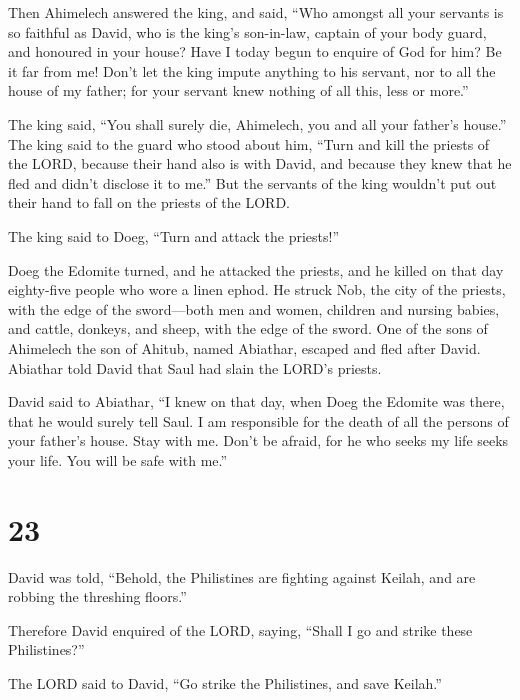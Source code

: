  Then Ahimelech answered the king, and said, ``Who
amongst all your servants is so faithful as David, who is the king's
son-in-law, captain of your body guard, and honoured in your house?
 Have I today begun to enquire of God for him? Be it far
from me! Don't let the king impute anything to his servant, nor to all
the house of my father; for your servant knew nothing of all this, less
or more.''

 The king said, ``You shall surely die, Ahimelech, you
and all your father's house.''  The king said to the
guard who stood about him, ``Turn and kill the priests of the LORD,
because their hand also is with David, and because they knew that he
fled and didn't disclose it to me.'' But the servants of the king
wouldn't put out their hand to fall on the priests of the LORD.

 The king said to Doeg, ``Turn and attack the priests!''

Doeg the Edomite turned, and he attacked the priests, and he killed on
that day eighty-five people who wore a linen ephod.  He
struck Nob, the city of the priests, with the edge of the sword---both
men and women, children and nursing babies, and cattle, donkeys, and
sheep, with the edge of the sword.  One of the sons of
Ahimelech the son of Ahitub, named Abiathar, escaped and fled after
David.  Abiathar told David that Saul had slain the
LORD's priests.

 David said to Abiathar, ``I knew on that day, when Doeg
the Edomite was there, that he would surely tell Saul. I am responsible
for the death of all the persons of your father's house. 
Stay with me. Don't be afraid, for he who seeks my life seeks your life.
You will be safe with me.''

\hypertarget{section-22}{%
\section{23}\label{section-22}}

 David was told, ``Behold, the Philistines are fighting
against Keilah, and are robbing the threshing floors.''

 Therefore David enquired of the LORD, saying, ``Shall I
go and strike these Philistines?''

The LORD said to David, ``Go strike the Philistines, and save Keilah.''

